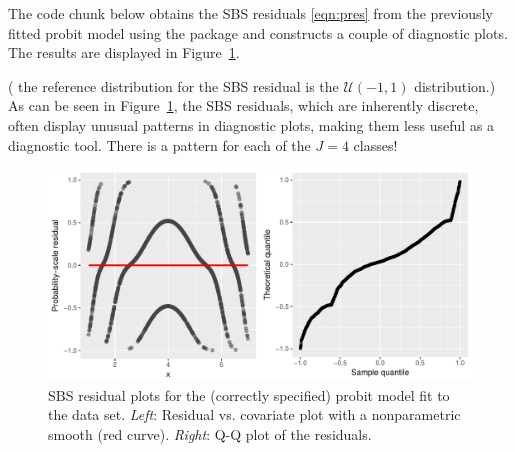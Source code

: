 The code chunk below obtains the SBS residuals \eqref{eqn:pres} from the previously fitted probit model  using the  package and constructs a couple of diagnostic plots. The results are displayed in Figure~\ref{fig:quadratic-correct-sbs}. 
( the reference distribution for the SBS residual is the $\left(-1, 1\right)$ distribution.) As can be seen in Figure~\ref{fig:quadratic-correct-sbs}, the SBS residuals, which are inherently discrete, often display unusual patterns in diagnostic plots, making them less useful as a diagnostic tool. There is a pattern for each of the $J = 4$ classes!
\begin{figure}[!htbp]
  \centering
  \includegraphics[width=1\textwidth]{quadratic-correct-sbs}
  \caption{SBS residual plots for the (correctly specified) probit model fit to the  data set. \textit{Left}: Residual vs. covariate plot with a nonparametric smooth (red curve). \textit{Right}: Q-Q plot of the residuals.}
  \label{fig:quadratic-correct-sbs}
\end{figure}

